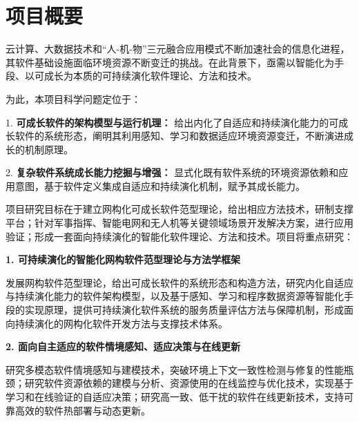 \documentclass{icsartcn}
\begin{document}
\frontmatter            %
\normalsize
\tableofcontents        %

\renewcommand\labelenumi{\theenumi)} %
\newcommand\boldred[1]{\textcolor{red}{\textbf{#1}}}
\newcommand{\myparagraph}[1]{\paragraph{#1}\mbox{}\\\indent}
\setcounter{tocdepth}{4}
\setcounter{secnumdepth}{4}


\mainmatter

\section{项目概要}
云计算、大数据技术和“人-机-物”三元融合应用模式不断加速社会的信息化进程，其软件基础设施面临环境资源不断变迁的挑战。在此背景下，亟需以智能化为手段、以可成长为本质的可持续演化软件理论、方法和技术。

为此，本项目科学问题定位于：

1. \textbf{可成长软件的架构模型与运行机理：} 给出内化了自适应和持续演化能力的可成长软件的系统形态，阐明其利用感知、学习和数据适应环境资源变迁，不断演进成长的机制原理。

2. \textbf{复杂软件系统成长能力挖掘与增强：} 显式化既有软件系统的环境资源依赖和应用意图，基于软件定义集成自适应和持续演化机制，赋予其成长能力。

项目研究目标在于建立网构化可成长软件范型理论，给出相应方法技术，研制支撑平台；针对军事指挥、智能电网和无人机等关键领域场景开发解决方案，进行应用验证；形成一套面向持续演化的智能化软件理论、方法和技术。项目将重点研究：

\textbf{1. 可持续演化的智能化网构软件范型理论与方法学框架}

发展网构软件范型理论，给出可成长软件的系统形态和构造方法，研究内化自适应与持续演化能力的软件架构模型，以及基于感知、学习和程序数据资源等智能化手段的实现原理，提供可持续演化软件系统的服务质量评估方法与保障机制，形成面向持续演化的网构化软件开发方法与支撑技术体系。

\textbf{2. 面向自主适应的软件情境感知、适应决策与在线更新}

研究多模态软件情境感知与建模技术，突破环境上下文一致性检测与修复的性能瓶颈；研究软件资源依赖的建模与分析、资源使用的在线监控与优化技术，实现基于学习和在线验证的自适应决策；研究高一致、低干扰的软件在线更新技术，支持可靠高效的软件热部署与动态更新。
\end{document}
